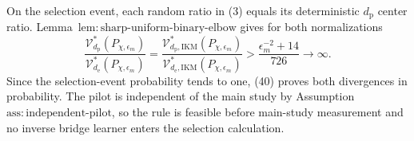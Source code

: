 On the selection event, each random ratio in (3) equals its deterministic \(d_{\mathrm p}\) center ratio.  Lemma~\(\mathrm{lem{:}sharp\text{-}uniform\text{-}binary\text{-}elbow}\) gives for both normalizations
\[
 \frac{\mathcal V_{d_{\mathrm p}}^*(P_{\chi,\epsilon_m})}
 {\mathcal V_{d_{\mathrm e}}^*(P_{\chi,\epsilon_m})}
 =\frac{\mathcal V_{d_{\mathrm p},\mathrm{IKM}}^*(P_{\chi,\epsilon_m})}
 {\mathcal V_{d_{\mathrm e},\mathrm{IKM}}^*(P_{\chi,\epsilon_m})}
 >\frac{\epsilon_m^{-2}+14}{726}\longrightarrow\infty.  \tag{40}
\]
Since the selection-event probability tends to one, (40) proves both divergences in probability.  The pilot is independent of the main study by Assumption~\(\mathrm{ass{:}independent\text{-}pilot}\), so the rule is feasible before main-study measurement and no inverse bridge learner enters the selection calculation.